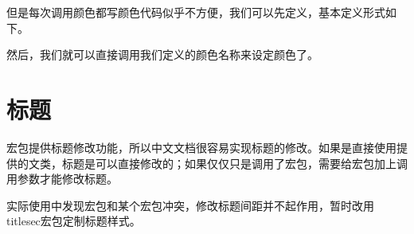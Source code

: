 \begin{center}
\color[RGB]{204, 128, 92}{Color Text中文测试}
\end{center}

\begin{latex}
\color[RGB]{204, 128, 92}{Color Text中文测试}
\end{latex}

但是每次调用颜色都写颜色代码似乎不方便，我们可以先定义，基本定义形式如下。
\begin{latex}
\usepackage{xcolor}%
\end{latex}

然后，我们就可以直接调用我们定义的颜色名称来设定颜色了。

\begin{center}
\end{center}

\begin{latex}
\color{keyword}{\slshape function, return, if, true, false}
\end{latex}

\section{标题}

\CTeX 宏包提供标题修改功能，所以中文文档很容易实现标题的修改。如果是直接使用\CTeX 提供的文类，标题是可以直接修改的；如果仅仅只是调用了\CTeX 宏包，需要给宏包加上调用参数才能修改标题。

\begin{latex}
\usepackage[
    heading=true,%
]{ctex}
\end{latex}

实际使用中发现\CTeX{}宏包和某个宏包冲突，修改标题间距并不起作用，暂时改用titlesec宏包定制标题样式。



